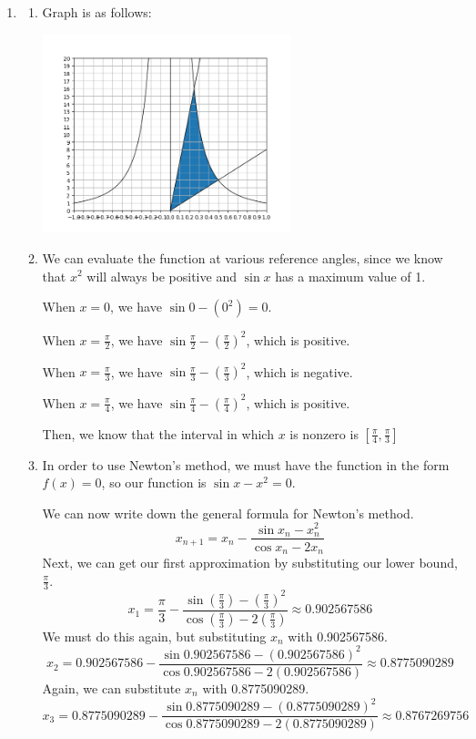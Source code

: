 \documentclass[11pt, letterpaper, twoside]{article}
\begin{document}
\begin{enumerate}
\item %
\begin{enumerate}[label=\alph*)]
\item Graph is as follows:

\includegraphics[width=0.6\textwidth]{q5}\par\vspace{1cm}
\item We can evaluate the function at various reference angles, since we know that \(x^2\) will always be positive and \(\sin x\) has a maximum value of 1.

When \(x=0\), we have \(\sin0-(0^2)=0\).

When \(x=\frac{\pi}{2}\), we have \(\sin\frac{\pi}{2}-(\frac{\pi}{2})^2\), which is positive.

When \(x=\frac{\pi}{3}\), we have \(\sin\frac{\pi}{3}-(\frac{\pi}{3})^2\), which is negative.

When \(x=\frac{\pi}{4}\), we have \(\sin\frac{\pi}{4}-(\frac{\pi}{4})^2\), which is positive.

Then, we know that the interval in which \(x\) is nonzero is \([\frac{\pi}{4}, \frac{\pi}{3}]\)

\item 
In order to use Newton's method, we must have the function in the form \(f(x)=0\), so our function is \(\sin x - x^2=0\).

We can now write down the general formula for Newton's method.
\[x_{n+1}=x_n-\frac{\sin x_n-x_n^2}{\cos x_n -2x_n}\]
Next, we can get our first approximation by substituting our lower bound, \(\frac{\pi}{3}\).
\[x_1=\frac{\pi}{3}-\frac{\sin(\frac{\pi}{3})-\left(\frac{\pi}{3}\right)^2}{\cos(\frac{\pi}{3})-2\left(\frac{\pi}{3}\right)}\approx0.902567586\]
We must do this again, but substituting \(x_n\) with 0.902567586.
\[x_2=0.902567586-\frac{\sin0.902567586-\left(0.902567586\right)^2}{\cos0.902567586-2\left(0.902567586\right)}\approx0.8775090289\]
Again, we can substitute \(x_n\) with 0.8775090289.
\[x_3=0.8775090289-\frac{\sin0.8775090289-\left(0.8775090289\right)^2}{\cos0.8775090289-2\left(0.8775090289\right)}\approx0.8767269756\]


\end{enumerate}
\end{enumerate}
\end{document}
